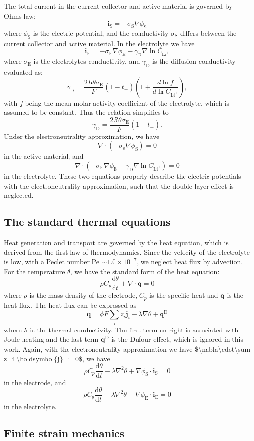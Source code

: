 The total current in the current collector and active material is governed by Ohm\textquotesingle{}s law\+: \[ \boldsymbol{i}_\text{S}=-\sigma_\text{S} \nabla\phi_\text{S} \] where $\phi_\text{S}$ is the electric potential, and the conductivity $\sigma_\text{S}$ differs between the current collector and active material. In the electrolyte we have \[ \boldsymbol{i}_\text{E}=-\sigma_\text{E}\nabla\phi_\text{E}-\gamma_\text{D}\nabla\ln C_{\text{Li}^+} \] where $\sigma_\text{E}$ is the electrolyte\textquotesingle{}s conductivity, and $\gamma_\text{D}$ is the diffusion conductivity evaluated as\+: \[ \gamma_\text{D}=\frac{2R\theta \sigma_\text{E}}{F}\left(1-t_+\right)\left(1+\frac{d \ln f}{d\ln C_{\text{Li}^+}}\right), \] with $f$ being the mean molar activity coefficient of the electrolyte, which is assumed to be constant. Thus the relation simplifies to \[ \gamma_\text{D}=\frac{2 R\theta \sigma_\text{E}}{F}\left(1-t_+\right). \] Under the electroneutrality approximation, we have \[ \nabla\cdot (- \sigma_\text{s}\nabla\phi_\text{S})=0 \] in the active material, and \[ \nabla\cdot\left(-\sigma_\text{E}\nabla\phi_\text{E}-\gamma_\text{D}\nabla\ln C_{\text{Li}^+}\right)=0 \] in the electrolyte. These two equations properly describe the electric potentials with the electroneutrality approximation, such that the double layer effect is neglected.\hypertarget{battery_particle_section2}{}\subsection{The standard thermal equations}\label{battery_particle_section2}
Heat generation and transport are governed by the heat equation, which is derived from the first law of thermodynamics. Since the velocity of the electrolyte is low, with a Peclet number Pe $\sim 1.0\times 10^{-7}$, we neglect heat flux by advection. For the temperature $\theta$, we have the standard form of the heat equation\+: \[ \rho C_p\frac{\text{d}\theta}{\text{d}t}+\nabla \cdot\boldsymbol{q}=0 \] where $\rho$ is the mass density of the electrode, $C_p$ is the specific heat and $\boldsymbol{q}$ is the heat flux. The heat flux can be expressed as \[ \boldsymbol{q}=\phi F\sum_i z_i\boldsymbol{j}_i-\lambda\nabla\theta+\boldsymbol{q}^\text{D} \] where $\lambda$ is the thermal conductivity. The first term on right is associated with Joule heating and the last term $\boldsymbol{q}^\text{D}$ is the Dufour effect, which is ignored in this work. Again, with the electroneutrality approximation we have \$\textbackslash{}nabla\textbackslash{}cdot\textbackslash{}sum z\+\_\+i \textbackslash{}boldsymbol\{j\}\+\_\+i=0\$, we have \[ \rho C_p\frac{\text{d}\theta}{\text{d}t}-\lambda \nabla^2\theta+\nabla\phi_\text{S}\cdot\boldsymbol{i}_\text{S}=0 \] in the electrode, and \[ \rho C_p\frac{\text{d}\theta}{\text{d}t}-\lambda \nabla^2\theta+\nabla\phi_\text{E}\cdot\boldsymbol{i}_\text{E}=0 \] in the electrolyte.\hypertarget{battery_particle_section3}{}\subsection{Finite strain mechanics}\label{battery_particle_section3}
